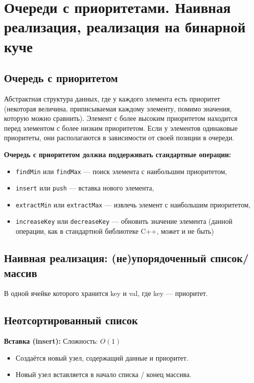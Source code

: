 \section{Очереди с приоритетами. Наивная реализация, реализация на бинарной куче}
	
\subsection*{Очередь с приоритетом} 

Абстрактная структура данных, где у каждого элемента есть приоритет (некоторая величина, приписываемая каждому элементу, помимо значения, которую можно сравнить). 
Элемент с более высоким приоритетом находится перед элементом с более низким приоритетом. 
Если у элементов одинаковые приоритеты, они располагаются в зависимости от своей позиции в очереди.

\textbf{Очередь с приоритетом должна поддерживать стандартные операции:}

\begin{itemize}
	\item \texttt{findMin} или \texttt{findMax} --- поиск элемента с наибольшим приоритетом,
	\item \texttt{insert} или \texttt{push} --- вставка нового элемента,
	\item \texttt{extractMin} или \texttt{extractMax} --- извлечь элемент с наибольшим приоритетом,
	\item \texttt{increaseKey} или \texttt{decreaseKey} --- обновить значение элемента (данной операции, как в стандартной библиотеке C++, может и не быть)
\end{itemize}

\subsection*{Наивная реализация: (не)упорядоченный список/массив} %

В одной ячейке которого хранится key и val, где key --- приоритет.

\subsection{Неотсортированный список} 
\textbf{Вставка (insert):} Сложность: $O(1)$
\begin{itemize} 
	\item Создаётся новый узел, содержащий данные и приоритет.
	\item Новый узел вставляется в начало списка / конец массива.
\end{itemize}

